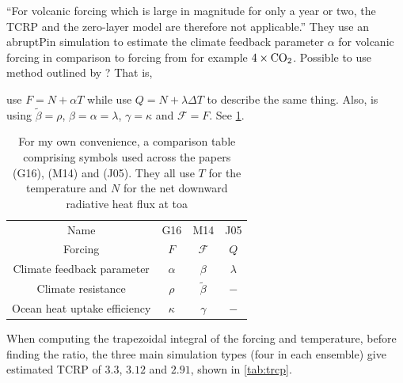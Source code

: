 \documentclass{ametsocV5}
\begin{document}
``For volcanic forcing which is large in magnitude for only a year or two, the TCRP and
the zero-layer model are therefore not applicable.'' They \citep{gregory2016} use an
abruptPin simulation to estimate the climate feedback parameter \(\alpha \) for volcanic
forcing in comparison to forcing from for example \(4\times \ce{CO2}\). Possible to use
method outlined by \citet{merlis2014}? That is,

\citet{gregory2016} use \(F=N+\alpha T\) while \citet{jones2005} use \(Q=N+\lambda \Delta T\)
to describe the same thing. Also, \citet{merlis2014} is using \(\tilde{\beta}=\rho\),
\(\beta =\alpha =\lambda \), \(\gamma =\kappa \) and \(\mathcal{F}=F\). See
\cref{tab:symbol-comparison}.

\begin{table}
  \centering
  \caption{For my own convenience, a comparison table comprising symbols used across
    the papers \citet{gregory2016} (G16), \citet{merlis2014} (M14) and \citet{jones2005}
    (J05). They all use \(T\) for the temperature and \(N\) for the net downward radiative
    heat flux at \acrshort{toa}}%
  \label{tab:symbol-comparison}
  \begin{tabular}{cccc}
    Name                         & G16         & M14                & J05          \\
    Forcing                      & \(F\)       & \(\mathcal{F}\)    & \(Q\)        \\
    Climate feedback parameter   & \(\alpha \) & \(\beta \)         & \(\lambda \) \\
    Climate resistance           & \(\rho \)   & \(\tilde{\beta }\) & \(-\)        \\
    Ocean heat uptake efficiency & \(\kappa \) & \(\gamma \)        & \(-\)        \\
  \end{tabular}
\end{table}

When computing the trapezoidal integral of the forcing and temperature, before finding
the ratio, the three main simulation types (four in each ensemble) give estimated TCRP
of \(3.3\), \(3.12\) and \(2.91\), shown in \cref{tab:trcp}.

\clearpage


\end{document}
